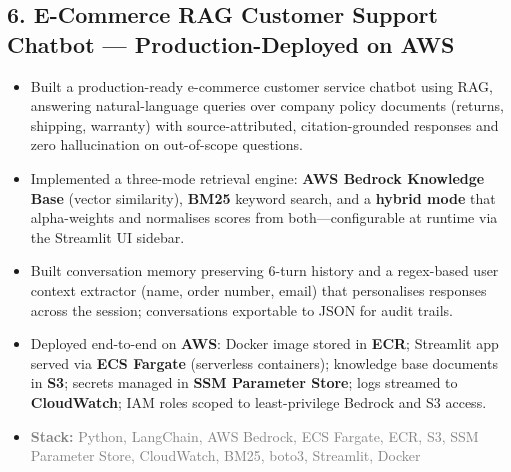 \documentclass[11pt,a4paper]{article}
\newcommand{\projectstack}[1]{\textcolor{graytext}{\textbf{Stack:} #1}}
\begin{document}
\subsection{6. E-Commerce RAG Customer Support Chatbot --- Production-Deployed on AWS}
\begin{itemize}[leftmargin=*, nosep, topsep=3pt]
    \item Built a production-ready e-commerce customer service chatbot using RAG, answering natural-language queries over company policy documents (returns, shipping, warranty) with source-attributed, citation-grounded responses and zero hallucination on out-of-scope questions.
    \item Implemented a three-mode retrieval engine: \textbf{AWS Bedrock Knowledge Base} (vector similarity), \textbf{BM25} keyword search, and a \textbf{hybrid mode} that alpha-weights and normalises scores from both---configurable at runtime via the Streamlit UI sidebar.
    \item Built conversation memory preserving 6-turn history and a regex-based user context extractor (name, order number, email) that personalises responses across the session; conversations exportable to JSON for audit trails.
    \item Deployed end-to-end on \textbf{AWS}: Docker image stored in \textbf{ECR}; Streamlit app served via \textbf{ECS Fargate} (serverless containers); knowledge base documents in \textbf{S3}; secrets managed in \textbf{SSM Parameter Store}; logs streamed to \textbf{CloudWatch}; IAM roles scoped to least-privilege Bedrock and S3 access.
    \item \projectstack{Python, LangChain, AWS Bedrock, ECS Fargate, ECR, S3, SSM Parameter Store, CloudWatch, BM25, boto3, Streamlit, Docker}
\end{itemize}
\end{document}
